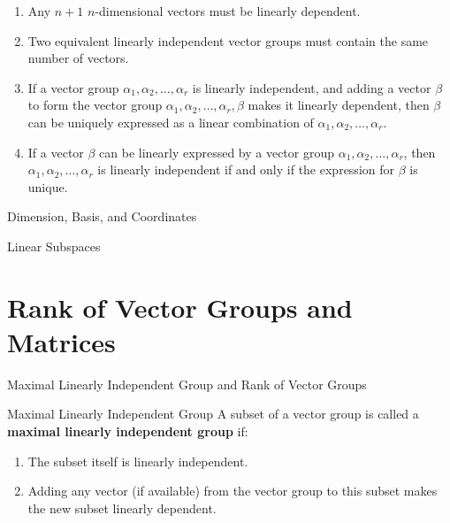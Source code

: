 \documentclass[11pt]{../../TexTemplate/elegantbook} %
\begin{document}
\begin{proposition}
\begin{enumerate}
    \item Any \( n+1 \) \( n \)-dimensional vectors must be linearly dependent.
    
    \item Two equivalent linearly independent vector groups must contain the same number of vectors.

    \item If a vector group \( \alpha_1, \alpha_2, \dots, \alpha_r \) is linearly independent, 
        and adding a vector \( \beta \) to form the vector group \( \alpha_1, \alpha_2, \dots, \alpha_r, \beta \) 
        makes it linearly dependent, then \( \beta \) can be uniquely expressed as a linear combination of 
        \( \alpha_1, \alpha_2, \dots, \alpha_r \).

    \item If a vector \( \beta \) can be linearly expressed by a vector group \( \alpha_1, \alpha_2, \dots, \alpha_r \), 
        then \( \alpha_1, \alpha_2, \dots, \alpha_r \) is linearly independent
        if and only if the expression for \( \beta \) is unique.
\end{enumerate}
\end{proposition}

\begin{leftbarTitle}{Dimension, Basis, and Coordinates}\end{leftbarTitle}

\begin{leftbarTitle}{Linear Subspaces}\end{leftbarTitle}


\section{Rank of Vector Groups and Matrices}
\begin{leftbarTitle}{Maximal Linearly Independent Group and Rank of Vector Groups}\end{leftbarTitle}
\begin{definition}{Maximal Linearly Independent Group}
    A subset of a vector group is called a \textbf{maximal linearly independent group} if:
    \begin{enumerate}
        \item The subset itself is linearly independent.
        \item Adding any vector (if available) from the vector group to this subset makes the new subset linearly dependent.
    \end{enumerate}
\end{definition}
\end{document}
